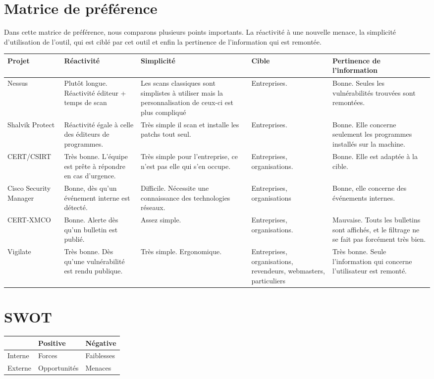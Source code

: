 \section{Matrice de préférence}
\thispagestyle{plain}

Dans cette matrice de préférence, nous comparons plusieurs points importants. La réactivité à une nouvelle menace, la simplicité d’utilisation de l’outil, qui est ciblé par cet outil et enfin la pertinence de l’information qui est remontée.\\

\small
\begin{tabular}{|p{2.5cm}|p{3.5cm}|p{3.5cm}|p{2cm}|p{3.5cm}|}
  \hline
  \rowcolor{Gainsboro}Projet & Réactivité & Simplicité & Cible & Pertinence de l'information \\
\hline

  Nessus & Plutôt longue. Réactivité éditeur + temps de scan & Les scans classiques sont simplistes à utiliser mais la personnalisation de ceux-ci est plus compliqué & Entreprises. & Bonne. Seules les vulnérabilités trouvées sont remontées. \\
\hline

  Shalvik Protect & Réactivité égale à celle des éditeurs de programmes. & Très simple il scan et installe les patchs tout seul. & Entreprises. & Bonne. Elle concerne seulement les programmes installés sur la machine. \\
\hline

  CERT/CSIRT & Très bonne. L’équipe est prête à répondre en cas d’urgence. & Très simple pour l’entreprise, ce n'est pas elle qui s’en occupe. & Entreprises, organisations. & Bonne. Elle est adaptée à la cible.\\
\hline

  Cisco Security Manager & Bonne, dès qu’un événement interne est détecté. & Difficile. Nécessite une connaissance des technologies réseaux. & Entreprises, organisations & Bonne, elle concerne des événements internes.\\
\hline

  CERT-XMCO & Bonne. Alerte dès qu’un bulletin est publié. & Assez simple. & Entreprises, organisations. & Mauvaise. Touts les bulletins sont affichés, et le filtrage ne se fait pas forcément très bien. \\
\hline

  Vigilate & Très bonne. Dès qu’une vulnérabilité est rendu publique. & Très simple. Ergonomique. & Entreprises, organisations, revendeurs, webmasters, particuliers & Très bonne. Seule l’information qui concerne l’utilisateur est remonté. \\
\hline
\end{tabular}
\normalsize  


\section{SWOT}
\begin{tabular}{|l|p{5cm}|p{5cm}|}
  \hline
  \rowcolor{Gainsboro} & Positive & Négative \\
  \hline

  Interne & Forces & Faiblesses \\
  \hline

  Externe & Opportunités & Menaces \\
  \hline
\end{tabular}
